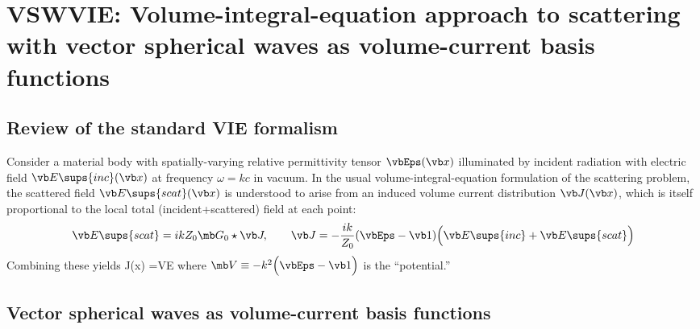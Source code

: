 \documentclass[letterpaper]{article}
\begin{document}
\newpage
\section{VSWVIE: Volume-integral-equation approach to scattering with vector spherical waves as volume-current basis functions}

\subsection{Review of the standard VIE formalism}

Consider a material body with
spatially-varying relative permittivity tensor $\vbEps(\vb x)$
illuminated by incident radiation with
electric field $\vb E\sups{inc}(\vb x)$
at frequency $\omega=kc$ in vacuum.
In the usual volume-integral-equation formulation of the
scattering problem, the scattered field $\vb E\sups{scat}(\vb x)$
is understood to arise from an induced volume current
distribution $\vb J(\vb x)$, which is itself proportional
to the local total (incident+scattered) field at each 
point:
$$
 \vb E\sups{scat} = ikZ_0 \mb G_0 \star \vb J,
 \qquad
 \vb J=-\frac{ik}{Z_0}(\vbEps-\vb 1)
         \Big(\vb E\sups{inc} + \vb E\sups{scat}\Big)
$$
Combining these yields
{\Big[ \vb 1 + \mb V \mb G\Big]
\vb J(\vb x) =\mb V\vb E
}
where $\mb V\equiv -k^2 \Big(\vbEps-\vb 1\Big)$ is the
``potential.''
 
\subsection{Vector spherical waves as volume-current basis functions}
\end{document}

